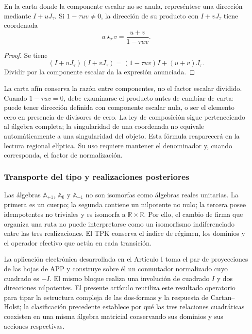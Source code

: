 \begin{proposition}
\label{trit-ampl-prop-pendientes}
En la carta donde la componente escalar no se anula, represéntese una
dirección mediante \(I+uJ_\tau\). Si \(1-\tau uv\ne0\), la dirección de su
producto con \(I+vJ_\tau\) tiene coordenada
\[
 u\star_\tau v=\frac{u+v}{1-\tau uv}.
\]
\end{proposition}
\begin{proof}
Se tiene
\[
 (I+uJ_\tau)(I+vJ_\tau)
   =(1-\tau uv)I+(u+v)J_\tau.
\]
Dividir por la componente escalar da la expresión anunciada.
\end{proof}

La carta afín conserva la razón entre componentes, no el factor escalar
dividido. Cuando \(1-\tau uv=0\), debe examinarse el producto antes de
cambiar de carta: puede tener dirección definida con componente escalar
nula, o ser el elemento cero en presencia de divisores de cero. La ley de
composición sigue perteneciendo al álgebra completa; la singularidad de
una coordenada no equivale automáticamente a una singularidad del objeto.
Esta fórmula reaparecerá en la lectura regional elíptica. Su uso requiere
mantener el denominador y, cuando corresponda, el factor de normalización.

\subsubsection{Transporte del tipo y realizaciones posteriores}
\label{trit-ampl-puentes}

Las álgebras \(\mathbb A_{+1}\), \(\mathbb A_0\) y
\(\mathbb A_{-1}\) no son isomorfas como álgebras reales unitarias.
La primera es un cuerpo; la segunda contiene un nilpotente no nulo; la
tercera posee idempotentes no triviales y es isomorfa a
\(\mathbb R\times\mathbb R\). Por ello, el cambio de firma que organiza una
ruta no puede interpretarse como un isomorfismo indiferenciado entre las
tres realizaciones. El TPK conserva el índice de régimen, los dominios y el
operador efectivo que actúa en cada transición.

La aplicación electrónica desarrollada en el Artículo I toma el par de
proyecciones de las hojas de APP y construye sobre él un conmutador
normalizado cuyo cuadrado es \(-I\). El mismo bloque realiza una involución de
cuadrado \(I\) y dos direcciones nilpotentes. El presente artículo reutiliza
este resultado operatorio para tipar la estructura compleja de las dos-formas
y la respuesta de Cartan--Holst; la clasificación precedente establece por
qué las tres relaciones cuadráticas coexisten en una misma álgebra matricial
conservando sus dominios y sus acciones respectivas.

